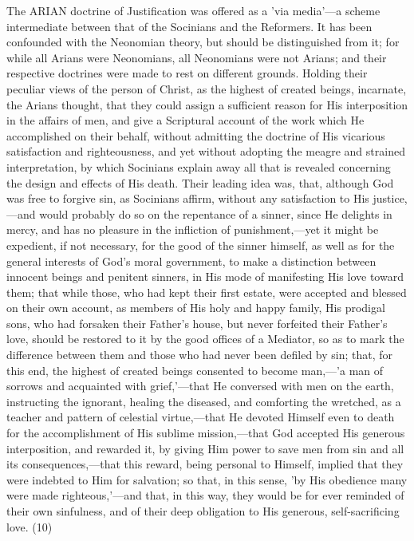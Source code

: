 \documentclass[
]{book}
\begin{document}
The ARIAN doctrine of Justification was offered as a 'via media'---a scheme intermediate between that of the Socinians and the Reformers. It has been confounded with the Neonomian theory, but should be distinguished from it; for while all Arians were Neonomians, all Neonomians were not Arians; and their respective doctrines were made to rest on different grounds. Holding their peculiar views of the person of Christ, as the highest of created beings, incarnate, the Arians thought, that they could assign a sufficient reason for His interposition in the affairs of men, and give a Scriptural account of the work which He accomplished on their behalf, without admitting the doctrine of His vicarious satisfaction and righteousness, and yet without adopting the meagre and strained interpretation, by which Socinians explain away all that is revealed concerning the design and effects of His death. Their leading idea was, that, although God was free to forgive sin, as Socinians affirm, without any satisfaction to His justice,---and would probably do so on the repentance of a sinner, since He delights in mercy, and has no pleasure in the infliction of punishment,---yet it might be expedient, if not necessary, for the good of the sinner himself, as well as for the general interests of God's moral government, to make a distinction between innocent beings and penitent sinners, in His mode of manifesting His love toward them; that while those, who had kept their first estate, were accepted and blessed on their own account, as members of His holy and happy family, His prodigal sons, who had forsaken their Father's house, but never forfeited their Father's love, should be restored to it by the good offices of a Mediator, so as to mark the difference between them and those who had never been defiled by sin; that, for this end, the highest of created beings consented to become man,---'a man of sorrows and acquainted with grief,'---that He conversed with men on the earth, instructing the ignorant, healing the diseased, and comforting the wretched, as a teacher and pattern of celestial virtue,---that He devoted Himself even to death for the accomplishment of His sublime mission,---that God accepted His generous interposition, and rewarded it, by giving Him power to save men from sin and all its consequences,---that this reward, being personal to Himself, implied that they were indebted to Him for salvation; so that, in this sense, 'by His obedience many were made righteous,'---and that, in this way, they would be for ever reminded of their own sinfulness, and of their deep obligation to His generous, self-sacrificing love. (10)
\end{document}
